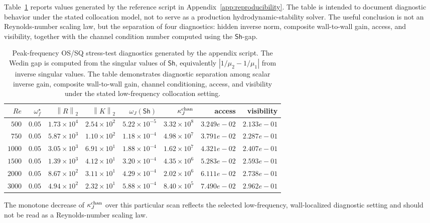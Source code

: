 \documentclass[review]{siamart220329}
\theoremstyle{definition}
\theoremstyle{remark}
\newcommand{\Sh}{\mathsf{Sh}}
\newcommand{\norm}[1]{\left\lVert #1\right\rVert}
\begin{document}
Table~\ref{tab:orr-sommerfeld-re} reports values generated by the reference
script in Appendix~\ref{app:reproducibility}. The table is intended to document
diagnostic behavior under the stated collocation model, not to serve as a
production hydrodynamic-stability solver. The useful conclusion is not an
Reynolds-number scaling law, but the separation of four diagnostics: hidden inverse
norm, composite wall-to-wall gain, access, and visibility, together with the
channel condition number computed using the $\Sh$-gap.

\begin{table}[ht]
\centering
\caption{Peak-frequency OS/SQ stress-test diagnostics generated by the appendix script. The Wedin gap is computed from the singular values of $\Sh$, equivalently $|1/\mu_2-1/\mu_1|$ from inverse singular values. The table demonstrates diagnostic separation among scalar inverse gain, composite wall-to-wall gain, channel conditioning, access, and visibility under the stated low-frequency collocation setting.}
\label{tab:orr-sommerfeld-re}
\begin{tabular}{@{}rrrrrrrr@{}}
\toprule
$Re$ & $\omega_f^\star$ & $\norm{R}_2$ & $\norm{K}_2$ & $\omega_J(\Sh)$ & $\kappa_J^{\rm chan}$ & access & visibility \\
\midrule
$500$ & $0.05$ & $1.73\times10^{4}$ & $2.54\times10^{2}$ & $5.22\times10^{-5}$ & $3.32\times10^{8}$ & $3.249e-02$ & $2.133e-01$ \\
$750$ & $0.05$ & $5.87\times10^{3}$ & $1.10\times10^{2}$ & $1.18\times10^{-4}$ & $4.98\times10^{7}$ & $3.791e-02$ & $2.287e-01$ \\
$1000$ & $0.05$ & $3.05\times10^{3}$ & $6.91\times10^{1}$ & $1.88\times10^{-4}$ & $1.62\times10^{7}$ & $4.321e-02$ & $2.407e-01$ \\
$1500$ & $0.05$ & $1.39\times10^{3}$ & $4.12\times10^{1}$ & $3.20\times10^{-4}$ & $4.35\times10^{6}$ & $5.283e-02$ & $2.593e-01$ \\
$2000$ & $0.05$ & $8.67\times10^{2}$ & $3.11\times10^{1}$ & $4.29\times10^{-4}$ & $2.02\times10^{6}$ & $6.111e-02$ & $2.738e-01$ \\
$3000$ & $0.05$ & $4.94\times10^{2}$ & $2.32\times10^{1}$ & $5.88\times10^{-4}$ & $8.40\times10^{5}$ & $7.490e-02$ & $2.962e-01$ \\
\bottomrule
\end{tabular}
\end{table}

The monotone decrease of $\kappa_J^{\rm chan}$ over this particular scan reflects the selected low-frequency, wall-localized diagnostic setting and should not be read as a Reynolds-number scaling law.
\end{document}
